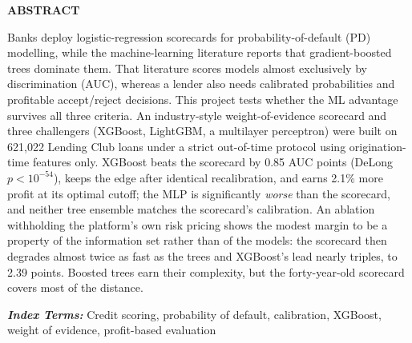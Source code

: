 \documentclass[a4paper,twocolumn,10pt]{article}
\begin{document}

\begin{center}\textbf{ABSTRACT}\end{center}
\noindent
Banks deploy logistic-regression scorecards for probability-of-default (PD) modelling, while the machine-learning literature reports that gradient-boosted trees dominate them. That literature scores models almost exclusively by discrimination (AUC), whereas a lender also needs calibrated probabilities and profitable accept/reject decisions. This project tests whether the ML advantage survives all three criteria. An industry-style weight-of-evidence scorecard and three challengers (XGBoost, LightGBM, a multilayer perceptron) were built on 621{,}022 Lending Club loans under a strict out-of-time protocol using origination-time features only. XGBoost beats the scorecard by 0.85 AUC points (DeLong $p<10^{-54}$), keeps the edge after identical recalibration, and earns 2.1\% more profit at its optimal cutoff; the MLP is significantly \emph{worse} than the scorecard, and neither tree ensemble matches the scorecard's calibration. An ablation withholding the platform's own risk pricing shows the modest margin to be a property of the information set rather than of the models: the scorecard then degrades almost twice as fast as the trees and XGBoost's lead nearly triples, to 2.39 points. Boosted trees earn their complexity, but the forty-year-old scorecard covers most of the distance.

\vspace{1mm}
\noindent\textbf{\textit{Index Terms:}} Credit scoring, probability of default, calibration, XGBoost, weight of evidence, profit-based evaluation
\end{document}
